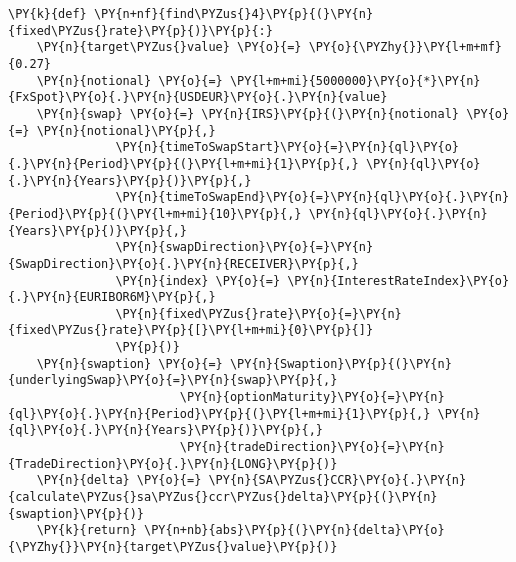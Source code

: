 \begin{tcolorbox}[breakable, size=fbox, boxrule=1pt, pad at break*=1mm,colback=cellbackground, colframe=cellborder]
\begin{Verbatim}[commandchars=\\\{\}]
\PY{k}{def} \PY{n+nf}{find\PYZus{}4}\PY{p}{(}\PY{n}{fixed\PYZus{}rate}\PY{p}{)}\PY{p}{:}
    \PY{n}{target\PYZus{}value} \PY{o}{=} \PY{o}{\PYZhy{}}\PY{l+m+mf}{0.27}
    \PY{n}{notional} \PY{o}{=} \PY{l+m+mi}{5000000}\PY{o}{*}\PY{n}{FxSpot}\PY{o}{.}\PY{n}{USDEUR}\PY{o}{.}\PY{n}{value}
    \PY{n}{swap} \PY{o}{=} \PY{n}{IRS}\PY{p}{(}\PY{n}{notional} \PY{o}{=} \PY{n}{notional}\PY{p}{,}
               \PY{n}{timeToSwapStart}\PY{o}{=}\PY{n}{ql}\PY{o}{.}\PY{n}{Period}\PY{p}{(}\PY{l+m+mi}{1}\PY{p}{,} \PY{n}{ql}\PY{o}{.}\PY{n}{Years}\PY{p}{)}\PY{p}{,}
               \PY{n}{timeToSwapEnd}\PY{o}{=}\PY{n}{ql}\PY{o}{.}\PY{n}{Period}\PY{p}{(}\PY{l+m+mi}{10}\PY{p}{,} \PY{n}{ql}\PY{o}{.}\PY{n}{Years}\PY{p}{)}\PY{p}{,}
               \PY{n}{swapDirection}\PY{o}{=}\PY{n}{SwapDirection}\PY{o}{.}\PY{n}{RECEIVER}\PY{p}{,}
               \PY{n}{index} \PY{o}{=} \PY{n}{InterestRateIndex}\PY{o}{.}\PY{n}{EURIBOR6M}\PY{p}{,}
               \PY{n}{fixed\PYZus{}rate}\PY{o}{=}\PY{n}{fixed\PYZus{}rate}\PY{p}{[}\PY{l+m+mi}{0}\PY{p}{]}
               \PY{p}{)}
    \PY{n}{swaption} \PY{o}{=} \PY{n}{Swaption}\PY{p}{(}\PY{n}{underlyingSwap}\PY{o}{=}\PY{n}{swap}\PY{p}{,}
                        \PY{n}{optionMaturity}\PY{o}{=}\PY{n}{ql}\PY{o}{.}\PY{n}{Period}\PY{p}{(}\PY{l+m+mi}{1}\PY{p}{,} \PY{n}{ql}\PY{o}{.}\PY{n}{Years}\PY{p}{)}\PY{p}{,}
                        \PY{n}{tradeDirection}\PY{o}{=}\PY{n}{TradeDirection}\PY{o}{.}\PY{n}{LONG}\PY{p}{)}
    \PY{n}{delta} \PY{o}{=} \PY{n}{SA\PYZus{}CCR}\PY{o}{.}\PY{n}{calculate\PYZus{}sa\PYZus{}ccr\PYZus{}delta}\PY{p}{(}\PY{n}{swaption}\PY{p}{)}
    \PY{k}{return} \PY{n+nb}{abs}\PY{p}{(}\PY{n}{delta}\PY{o}{\PYZhy{}}\PY{n}{target\PYZus{}value}\PY{p}{)}


\end{Verbatim}
\end{tcolorbox}
